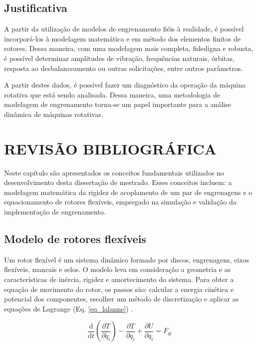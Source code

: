 \documentclass[10pt,fleqn,a4paper,twoside]{article}
\begin{document}
	\subsection{Justificativa}
	
	A partir da utilização de modelos de engrenamento fiéis à realidade, é possível incorporá-los à modelagem matemática e em método dos elementos finitos de rotores. Dessa maneira, com uma modelagem mais completa, fidedigna e robusta, é possível determinar amplitudes de vibração, frequências naturais, órbitas, resposta ao desbalanceamento ou outras solicitações, entre outros parâmetros. 
	
	A partir destes dados, é possível fazer um diagnóstico da operação da máquina rotativa que está sendo analisada. Dessa maneira, uma metodologia de modelagem de engrenamento torna-se um papel importante para a análise dinâmica de máquinas rotativas.
	
	\section{REVISÃO BIBLIOGRÁFICA}
	
	Neste capítulo são apresentados os conceitos fundamentais utilizados no desenvolvimento desta dissertação de mestrado. Esses conceitos incluem: a modelagem matemática da rigidez de acoplamento de um par de engrenagens e o equacionamento de rotores flexíveis, empregado na simulação e validação da implementação de engrenamento.
	
	\subsection{Modelo de rotores flexíveis}
	
	Um rotor flexível é um sistema dinâmico formado por discos, engrenagens, eixos flexíveis, mancais e selos. O modelo leva em consideração a geometria e as características de inércia, rigidez e amortecimento do sistema. Para obter a equação de movimento do rotor, os passos são: calcular a energia cinética e potencial dos componentes, escolher um método de discretização e aplicar as equações de Lagrange (Eq. \ref{eq_lalanne}) \citep{Lalanne1998}.
	
	\begin{equation}
		\frac{\mathrm{d} }{\mathrm{d} t}\left ( \frac{\partial T}{\partial \dot{q_i}} \right )-\frac{\partial T}{\partial q_i} + \frac{\partial U}{\partial q_i}=F_{qi}
		\label{eq_lalanne}
	\end{equation}
	
\end{document}
